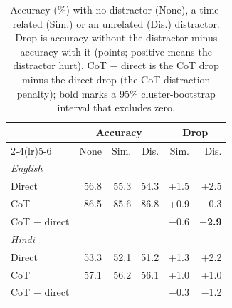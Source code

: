 \begin{table}[t]
\centering
\small
\setlength{\tabcolsep}{4pt}
\begin{tabular}{lrrrrr}
\toprule
 & \multicolumn{3}{c}{Accuracy} & \multicolumn{2}{c}{Drop} \\
\cmidrule(lr){2-4}\cmidrule(lr){5-6}
 & None & Sim. & Dis. & Sim. & Dis. \\
\midrule
\multicolumn{6}{l}{\textit{English}} \\
\quad Direct & 56.8 & 55.3 & 54.3 & +1.5 & +2.5 \\
\quad CoT & 86.5 & 85.6 & 86.8 & +0.9 & $-$0.3 \\
\quad CoT $-$ direct &  &  &  & $-$0.6 & \textbf{$-$2.9} \\
\midrule
\multicolumn{6}{l}{\textit{Hindi}} \\
\quad Direct & 53.3 & 52.1 & 51.2 & +1.3 & +2.2 \\
\quad CoT & 57.1 & 56.2 & 56.1 & +1.0 & +1.0 \\
\quad CoT $-$ direct &  &  &  & $-$0.3 & $-$1.2 \\
\bottomrule
\end{tabular}
\caption{Accuracy (\%) with no distractor (None), a time-related (Sim.) or an unrelated (Dis.) distractor. Drop is accuracy without the distractor minus accuracy with it (points; positive means the distractor hurt). CoT $-$ direct is the CoT drop minus the direct drop (the CoT distraction penalty); bold marks a 95\% cluster-bootstrap interval that excludes zero.}
\label{tab:distractor}
\end{table}
